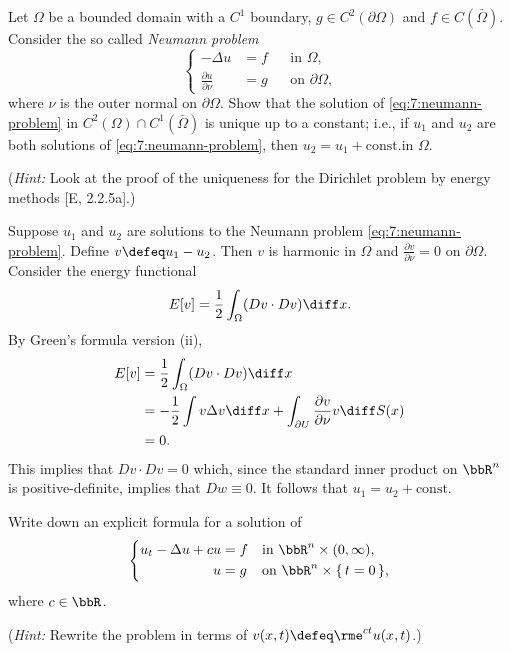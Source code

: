 \begin{problem}
  Let \(\Omega\) be a bounded domain with a \(C^1\) boundary, \(g\in
  C^2(\partial\Omega)\) and \(f\in C(\bar\Omega)\). Consider the so called
  \emph{Neumann problem}
  \[
    \label{eq:7:neumann-problem}%
    \tag{\(*\)}%
    \left\{
      \begin{aligned}
        -\Delta u&=f&&\text{in \(\Omega\),}\\
        \frac{\partial u}{\partial\nu}&=g&&\text{on \(\partial\Omega\),}
      \end{aligned}
    \right.
  \]
  where \(\nu\) is the outer normal on \(\partial\Omega\). Show that the
  solution of \eqref{eq:7:neumann-problem} in
  \(C^2(\Omega)\cap C^1(\bar\Omega)\) is unique up to a constant; i.e., if
  \(u_1\) and \(u_2\) are both solutions of \eqref{eq:7:neumann-problem},
  then \(u_2=u_1+\text{const.}\)\@ in \(\Omega\).

  \noindent (\emph{Hint:} Look at the proof of the uniqueness for the
  Dirichlet problem by energy methods [E, 2.2.5a].)
\end{problem}
\begin{solution}
  Suppose \(u_1\) and \(u_2\) are solutions to the Neumann problem
  \eqref{eq:7:neumann-problem}. Define \(v\defeq u_1-u_2\). Then \(v\) is
  harmonic in \(\Omega\) and \(\frac{\partial v}{\partial \nu}=0\) on
  \(\partial\Omega\). Consider the energy functional
  \[
    E[v]=\frac{1}{2}\int_\Omega(Dv\cdot Dv)\diff x.
  \]
  By Green's formula version (ii),
  \begin{align*}
    E[v]
    &=\frac{1}{2}\int_\Omega(Dv\cdot Dv)\diff x\\
    &=-\frac{1}{2}\int v\Delta v\diff x
      +\int_{\partial U}\frac{\partial
      v}{\partial\nu} v\diff S(x)\\
    &=0.
  \end{align*}
  This implies that \(Dv\cdot Dv=0\) which, since the standard inner
  product on \(\bbR^n\) is positive-definite, implies that \(Dw\equiv
  0\). It follows that \(u_1=u_2+\text{const}\).
\end{solution}
\newpage

\begin{problem}
  Write down an explicit formula for a solution of
  \[
    \left\{
      \begin{aligned}
        u_t-\Delta u+cu&=f&&\text{in \(\bbR^n\times(0,\infty)\),}\\
        u&=g&&\text{on \(\bbR^n\times\{\,t=0\,\}\),}
      \end{aligned}
    \right.
  \]
  where \(c\in\bbR\).

  \noindent (\emph{Hint:} Rewrite the problem in terms of
  \(v(x,t)\defeq\rme^{ct}u(x,t)\).)
\end{problem}
\begin{solution}
\end{solution}

